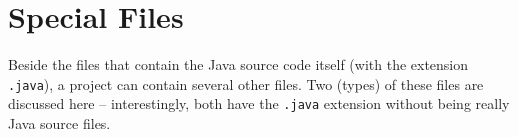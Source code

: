 \chapter{Special Files}
Beside the files that contain the Java source code itself (with the extension \verb#.java#), a project can contain several other files. Two (types) of these files are discussed here – interestingly, both have the \verb#.java# extension without being really Java source files.





